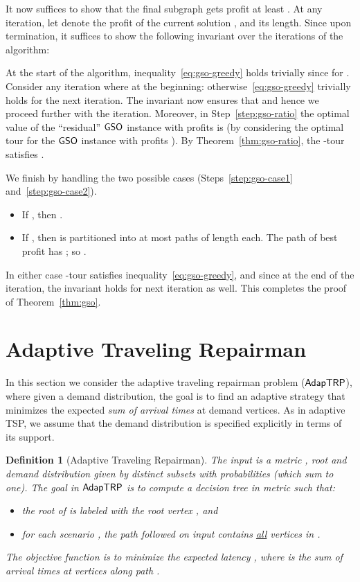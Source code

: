\documentclass[11pt]{article}
\newtheorem{definition}{Definition}
\def\strp{\ensuremath{{\sf AdapTRP}}\xspace}
\def\gso{\ensuremath{{\sf GSO}}\xspace}
\begin{document}
  It now
  suffices to show that the final subgraph  gets profit at least
  . At any iteration, let  denote the
  profit of the current solution , and  its length. Since  upon
  termination, it suffices to show the following invariant 
  over the iterations of the algorithm:
  

At the start of the algorithm, inequality~\eqref{eq:gso-greedy} holds trivially
  since  for . Consider any iteration where
   at the beginning: otherwise~\eqref{eq:gso-greedy} trivially holds for the next iteration. The
  invariant now ensures that  and hence we proceed
  further with the iteration. Moreover, in Step~\ref{step:gso-ratio} the optimal value
  of the ``residual'' \gso instance with profits  is  (by considering the optimal tour for the \gso instance with profits ). By Theorem~\ref{thm:gso-ratio}, the -tour  satisfies .
  

We finish by handling the two possible cases
(Steps~\ref{step:gso-case1} and~\ref{step:gso-case2}).
  \begin{itemize}
  \item If , then .
  \item If , then  is partitioned into at most  paths of length  each. The path  of best profit has ; so .
  \end{itemize}
In either case -tour  satisfies  inequality~\eqref{eq:gso-greedy}, and since  at the end of  the
iteration, the invariant holds for next iteration as well. This completes the proof of Theorem~\ref{thm:gso}.





\section{Adaptive Traveling Repairman}
\label{sec:strp}

In this section we consider the adaptive traveling repairman problem (\strp), where given a demand distribution, the goal is to
find an adaptive strategy that minimizes the expected {\em sum  of arrival times} at demand vertices. As in adaptive TSP, we assume that the demand distribution  is specified explicitly in terms of its support. 


\smallskip 
\begin{definition}[Adaptive Traveling Repairman]
The input is a metric , root  and demand distribution  given by  distinct subsets  with  probabilities  (which sum to one). The goal in \strp is to compute a decision tree  in
metric  such that:
  \begin{itemize}
  \item the root of  is labeled with the root vertex , and
  \item for each scenario , the path  followed on input  contains \underline{all} vertices in .
  \end{itemize}
  The objective function is to minimize the expected latency
  , where  is the sum of arrival times at vertices  along path .
\end{definition}
\end{document}
